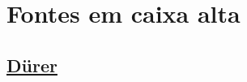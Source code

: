 \documentclass[a4paper]{article}
\newcommand{\frase}{The quick brown fox jumps over the sleazy dog}
\newcommand{\fonte}[2]{
  {\fontfamily{#1}\selectfont #2}
}
\begin{document}
% 
% 
% 
% 
% 


% 
% 
% 
% 
% 



% 
% 
% 
% 
% 
% 
% 
% 



% 
% 
% 
% 
% 



\section*{Fontes em caixa alta}

\subsection*{\href{http://www.tug.dk/FontCatalogue/duerer/}{D\"urer}}
\end{document}
